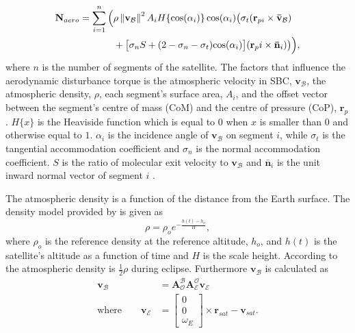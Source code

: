 \begin{equation}
\begin{aligned}
\mathbf{N}_{aero} = \sum_{i=1}^{n}\Big(& \rho \norm{\mathbf{v}_{\mathcal{B}}}^2 A_i H \{\text{cos}(\alpha_i)\} \, \text{cos}(\alpha_i) \big(\sigma_t (\mathbf{r}_{pi} \times \mathbf{\bar{v}}_{\mathcal{B}}) \\
					 & + \big[ \sigma_nS + (2 - \sigma_n - \sigma_t) \text{cos}(\alpha_i)\big] (\mathbf{r}_pi \times \mathbf{\bar{n}}_i) \big) \vphantom{\norm{\mathbf{v}_{\mathcal{B}}}^2}\Big),
\end{aligned}
\end{equation}
where $n$ is the number of segments of the satellite. The factors that influence the aerodynamic disturbance torque is the atmospheric velocity in SBC, $\mathbf{v}_{\mathcal{B}}$, the atmospheric density, $\rho$, each segment's surface area, $A_i$, and the offset vector between the segment's centre of mass (CoM) and the centre of pressure (CoP), $\mathbf{r}_p$. $H\{x\}$ is the Heaviside function which is equal to $0$ when $x$ is smaller than $0$ and otherwise equal to $1$. $\alpha_i$ is the incidence angle of $\mathbf{v}_{\mathcal{B}}$ on segment $i$, while $\sigma_t$ is the tangential accommodation coefficient and $\sigma_n$ is the normal accommodation coefficient. $S$ is the ratio of molecular exit velocity to $\mathbf{v}_{\mathcal{B}}$ and $\mathbf{\bar{n}}_i$ is the unit inward normal vector of segment $i$ \cite{JansevanVuuren2015}.

The atmospheric density is a function of the distance from the Earth surface. The density model provided by \cite{vallado2001fundamentals} is given as 
\begin{equation}
\rho = \rho_o e^{-\frac{h(t)-h_o}{H}},
\end{equation}
where $\rho_o$ is the reference density at the reference altitude, $h_o$, and $h(t)$ is the satellite's altitude as a function of time and $H$ is the scale height. According to \cite{steyn2011CubeSat} the atmospheric density is $\frac{1}{2}\rho$ during eclipse. Furthermore $\mathbf{v}_{\mathcal{B}}$ is calculated as
\begin{equation}
\begin{aligned}
\mathbf{v}_{\mathcal{B}} &= \boldsymbol{A}^{\mathcal{B}}_{\mathcal{O}} \boldsymbol{A}_{\mathcal{E}}^{\mathcal{O}} \mathbf{v}_{\mathcal{E}} \\
\text{where}  \qquad \mathbf{v}_{\mathcal{E}} &= \begin{bmatrix} 0 \\ 0 \\ \omega_E \end{bmatrix} \times \mathbf{r}_{sat} - \mathbf{v}_{sat}.
\end{aligned}
\end{equation}

